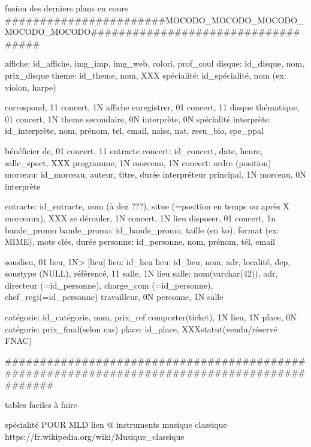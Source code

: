 \documentclass[12pt,a4paper]{article}
\begin{document}
{fusion des derniers plans en cours
#######################MOCODO_MOCODO_MOCODO_MOCODO_MOCODO###################################

affiche: id_affiche, img_imp, img_web, colori, prof_coul
disque: id_disque, nom, prix_disque
theme: id_theme, nom, XXX
spécialité: id_spécialité, nom (ex: violon, harpe)

correspond, 11 concert, 1N affiche
enregistrer, 01 concert, 11 disque
thématique, 01 concert, 1N theme
secondaire, 0N interprète, 0N spécialité
interprète: id_interprète, nom, prénom, tel, email, naiss, nat, resu_bio, spe_ppal

bénéficier de, 01 concert, 11 entracte
concert: id_concert, date, heure, salle_spect, XXX
programme, 1N morceau, 1N concert: ordre (position)
morceau: id_morceau, auteur, titre, durée
interpréteur principal, 1N morceau, 0N interprète

entracte: id_entracte, nom (à dez ???), situe (=position en temps ou après X morceaux), XXX
se dérouler, 1N concert, 1N lieu
disposer, 01 concert, 1n bande_promo
bande_promo: id_bande_promo, taille (en ko), format (ex: MIME), mots clés, durée
personne: id_personne, nom, prénom, tél, email

souslieu, 01 lieu,   1N> [lieu] lieu: id_lieu
lieu: id_lieu, nom, adr, localité, dep, soustype (NULL),
référencé, 11 salle, 1N lieu
salle: nom(varchar(42)), adr, directeur (=id_personne), charge_com (=id_personne), chef_regi(=id_personne)
travailleur, 0N personne, 1N salle

catégorie: id_catégorie, nom, prix_ref
comporter(ticket), 1N lieu, 1N place, 0N catégorie: prix_final(selon cas)
place: id_place, XXXstatut(vendu/réservé FNAC)


#############################################################################################


























tables faciles à faire

spécialité
POUR MLD
lien @ instruments musique classique
https://fr.wikipedia.org/wiki/Musique_classique

}
\end{document}
